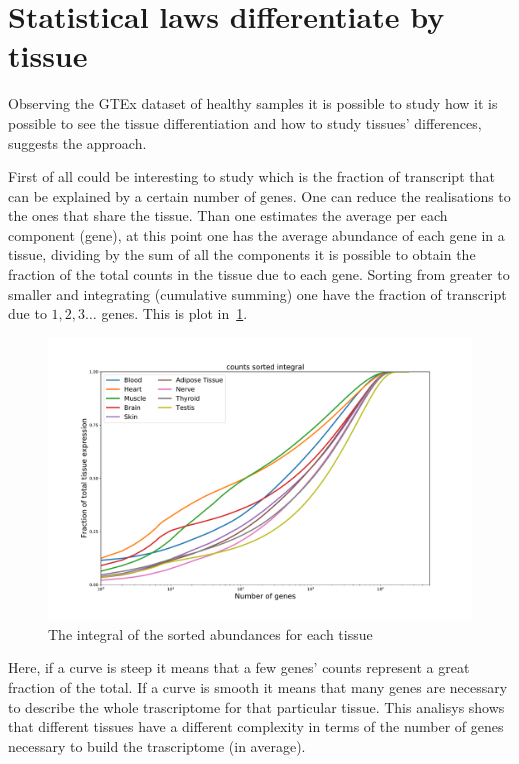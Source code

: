 \section{Statistical laws differentiate by tissue}
Observing the GTEx dataset of healthy samples it is possible to study how it is possible to see the tissue differentiation and how to study tissues' differences,~\cite{mele2014} suggests the approach.

First of all could be interesting to study which is the fraction of transcript that can be explained by a certain number of genes.
One can reduce the realisations to the ones that share the tissue. Than one estimates the average per each component (gene), at this point one has the average abundance of each gene in a tissue, dividing by the sum of all the components it is possible to obtain the fraction of the total counts in the tissue due to each gene. Sorting from greater to smaller and integrating (cumulative summing) one have the fraction of transcript due to $1, 2, 3\dots$ genes. This is plot in~\ref{fig:structure/gtex/fraction_of_trascriptome}. 
\begin{figure}[htb!]
  \centering
  \includegraphics[width=0.9\linewidth]{pictures/structure/gtex/fraction_of_trascriptome.pdf}
  \caption{The integral of the sorted abundances for each tissue}
  \label{fig:structure/gtex/fraction_of_trascriptome}
\end{figure}
Here, if a curve is steep it means that a few genes' counts represent a great fraction of the total. If a curve is smooth it means that many genes are necessary to describe the whole trascriptome for that particular tissue.
This analisys shows that different tissues have a different complexity in terms of the number of genes necessary to build the trascriptome (in average).
